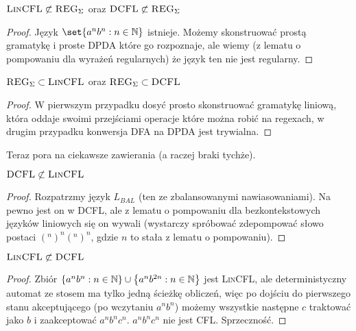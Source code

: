 \begin{theorem}
    \(\textsc{LinCFL} \not \subset \textsc{REG}_\Sigma \) oraz \(\textsc{DCFL} \not \subset \textsc{REG}_\Sigma\)
\end{theorem}

\begin{proof}
    Język \( \set{a^nb^n : n\in \natural} \) istnieje. Możemy skonstruować prostą gramatykę i proste DPDA które go rozpoznaje, ale wiemy (z lematu o pompowaniu dla wyrażeń regularnych) że język ten nie jest regularny.
\end{proof}

\begin{theorem}
    \( \textsc{REG}_\Sigma \subset \textsc{LinCFL} \) oraz \( \textsc{REG}_\Sigma \subset \textsc{DCFL}\)
\end{theorem}

\begin{proof}
    W pierwszym przypadku dosyć prosto skonstruować gramatykę liniową, która oddaje swoimi przejściami operacje które można robić na regexach, w drugim przypadku konwersja DFA na DPDA jest trywialna.
\end{proof}

Teraz pora na ciekawsze zawierania (a raczej braki tychże). 

\begin{theorem}
    \( \textsc{DCFL} \not \subset \textsc{LinCFL} \)
\end{theorem}

\begin{proof}
    Rozpatrzmy język \(L_{BAL}\) (ten ze zbalansowanymi nawiasowaniami). Na pewno jest on w DCFL, ale z lematu o pompowaniu dla bezkontekstowych języków liniowych się on wywali (wystarczy spróbować zdepompować słowo postaci \( (^n)^n(^n)^n \), gdzie \(n\) to stała z lematu o pompowaniu).
\end{proof}

\begin{theorem}
     \( \textsc{LinCFL} \not \subset \textsc{DCFL} \)
\end{theorem}
\begin{proof}
    Zbiór \(\left\{a^nb^n: n \in \mathbb{N}\right\} \cup \left\{a^nb^{2n}:n\in\mathbb{N}\right\}\) jest \textsc{LinCFL},
    ale deterministyczny automat ze stosem ma tylko jedną ścieżkę obliczeń, więc po dojściu do pierwszego stanu akceptującego (po wczytaniu \(a^nb^n\)) możemy wszystkie następne \(c\) traktować jako \(b\) i zaakceptować \(a^nb^nc^n\). \(a^nb^nc^n\) nie jest \textsc{CFL}. Sprzeczność.
\end{proof}

